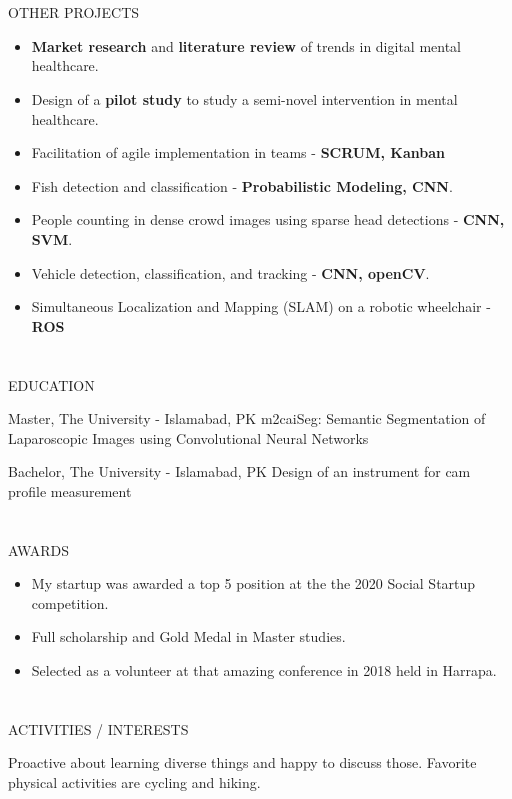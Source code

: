 \documentclass{my_cv}
\begin{document}
\begin{multicols}{2}
\section{\faPaintBrush}{OTHER PROJECTS}
\begin{itemize}[noitemsep]
    \item \textbf{Market research} and \textbf{literature review} of trends in digital mental healthcare.
    \item Design of a \textbf{pilot study} to study a semi-novel intervention in mental healthcare.
    \item Facilitation of agile implementation in teams - \textbf{SCRUM, Kanban}
    \item Fish detection and classification - \textbf{Probabilistic Modeling, CNN}.
    \item People counting in dense crowd images using sparse head detections - \textbf{CNN, SVM}.
    \item Vehicle detection, classification, and tracking - \textbf{CNN, openCV}.
    \item Simultaneous Localization and Mapping (SLAM) on a robotic wheelchair - \textbf{ROS}
\end{itemize}

\section{\faGraduationCap}{EDUCATION}
    
{Master, The University - Islamabad, PK} %
{m2caiSeg: Semantic Segmentation of Laparoscopic Images using Convolutional Neural Networks}
    
{Bachelor, The University - Islamabad, PK} %
{Design of an instrument for cam profile measurement}

\section{\faStar}{AWARDS}

\begin{itemize}[noitemsep]
    \item My startup was awarded a top 5 position at the the 2020 Social Startup competition.
    \item Full scholarship and Gold Medal in Master studies.
    \item Selected as a volunteer at that amazing conference in 2018 held in Harrapa.
\end{itemize}

\section{\faSoccerBallO}{ACTIVITIES / INTERESTS}

Proactive about learning diverse things and happy to discuss those. Favorite physical activities are cycling and hiking.


\end{multicols}
\end{document}
